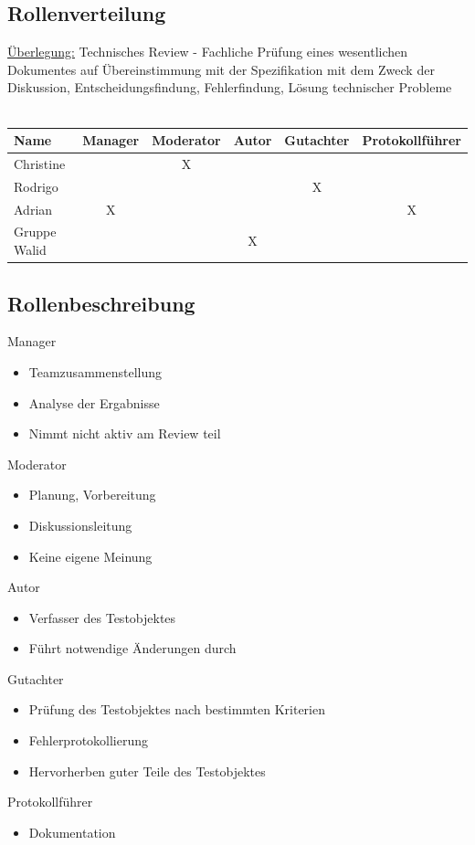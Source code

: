 \documentclass[11pt]{article}
\begin{document}
    \subsection{Rollenverteilung}
    \underline{\"Uberlegung:} Technisches Review - Fachliche Pr\"ufung eines wesentlichen Dokumentes auf \"Ubereinstimmung mit der Spezifikation mit dem Zweck der Diskussion, Entscheidungsfindung, Fehlerfindung, L\"osung technischer Probleme\\~\\
    \begin{tabular}{l|c|c|c|c|c}
        \textbf{Name} & \textbf{Manager} & \textbf{Moderator} & \textbf{Autor} & \textbf{Gutachter} & \textbf{Protokollf\"uhrer} \\ \hline
        Christine & & X & & & \\ \hline
        Rodrigo & & & & X & \\ \hline
        Adrian & X & & & & X \\ \hline
        Gruppe Walid & & & X & & \\ \hline
    \end{tabular}
    \subsection{Rollenbeschreibung}
    Manager
    \begin{itemize}
        \item Teamzusammenstellung
        \item Analyse der Ergabnisse
        \item Nimmt nicht aktiv am Review teil
    \end{itemize}
    Moderator
    \begin{itemize}
        \item Planung, Vorbereitung
        \item Diskussionsleitung
        \item Keine eigene Meinung
    \end{itemize}
    Autor
    \begin{itemize}
        \item Verfasser des Testobjektes
        \item F\"uhrt notwendige \"Anderungen durch
    \end{itemize}
    Gutachter
    \begin{itemize}
        \item Pr\"ufung des Testobjektes nach bestimmten Kriterien
        \item Fehlerprotokollierung
        \item Hervorherben guter Teile des Testobjektes
    \end{itemize}
    Protokollf\"uhrer
    \begin{itemize}
        \item Dokumentation
    \end{itemize}
\end{document}
